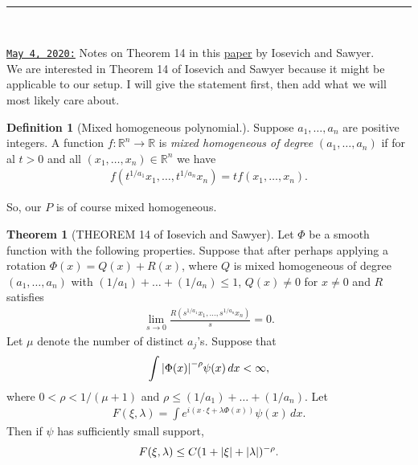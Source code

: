 \documentclass{article}
\theoremstyle{definition}
\newtheorem{defn}{Definition}[section]
\newtheorem{thm}{Theorem}[section]
\newcommand{\f}[2]{\frac{#1}{#2}}
\newcommand{\lp}{\left(}
\newcommand{\rp}{\right)}
\begin{document}
$\,$\\

\hrule

$\,$\\



\newpage




\underline{\texttt{May 4, 2020:}} Notes on Theorem 14 in this \href{https://core.ac.uk/download/pdf/82381721.pdf}{\underline{paper}} by Iosevich and Sawyer.\\


\noindent We are interested in Theorem 14 of Iosevich and Sawyer because it might be applicable to our setup. I will give the statement first, then add what we will most likely care about.\\


\begin{defn}[Mixed homogeneous polynomial.]
    Suppose $a_1,\dots,a_n$ are positive integers. A function $f: \mathbb{R}^n \to \mathbb{R}$ is \textit{mixed homogeneous of degree} $(a_1,\dots,a_n)$ if for al $t>0$ and all $(x_1,\dots,x_n) \in \mathbb{R}^n$ we have
    \begin{align*}
        f\lp t^{1/a_1}x_1,\dots,t^{1/a_n}x_n \rp = tf(x_1,\dots,x_n).
    \end{align*}
\end{defn}

So, our $P$ is of course mixed homogeneous.  



\begin{thm}[THEOREM 14 of Iosevich and Sawyer] 
    Let $\Phi$ be a smooth function with the following properties. Suppose that after perhaps applying a rotation $\Phi(x) = Q(x) + R(x)$, where $Q$ is mixed homogeneous of degree $(a_1,\dots,a_n)$ with $(1/a_1) + \dots + (1/a_n) \leq 1$, $Q(x) \neq 0$ for $x\neq 0$ and $R$ satisfies 
    \begin{align*}
        \lim_{s\to 0} \f{R(s^{1/a_1} x_1, \dots, s^{1/a_n} x_n)}{s} = 0.
    \end{align*}
    Let $\mu$ denote the number of distinct $a_j$'s. Suppose that 
    \begin{align*}
    \int \abs{\Phi(x)}^{-\rho} \psi(x)\,dx < \infty,
    \end{align*}
    where $0 < \rho < 1/(\mu+1)$ and $\rho \leq (1/a_1)+\dots + (1/a_n)$. Let 
    \begin{align*}
        F(\xi,\lambda) = \int e^{i(x\cdot \xi + \lambda \Phi(x))}\psi(x)\,dx.
    \end{align*}
    Then if $\psi$ has sufficiently small support,
    \begin{align*}
        F(\xi,\lambda) \leq C(1+ \abs{\xi} + \abs{\lambda})^{-\rho}.
    \end{align*}
\end{thm}
\end{document}
